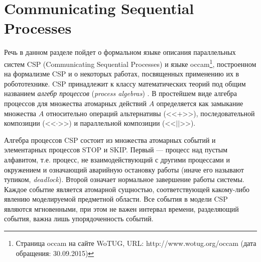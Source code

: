 \documentclass[conference]{IEEEtran}
\begin{document}
\section{Communicating Sequential Processes}
Речь в данном разделе пойдет о формальном языке описания параллельных систем CSP 
(Communicating Sequential Processes) и языке 
occam\footnote{Страница occam на сайте WoTUG, URL: http://www.wotug.org/occam (дата обращения: 30.09.2015)}, 
построенном на формализме CSP и о некоторых работах, посвященных применению их 
в робототехнике. CSP принадлежит к классу математических теорий под общим 
названием \textit{алгебр процессов} (\textit{process algebras})
\cite{baeten2005brief, fokkink2013introduction}. В простейшем виде алгебра 
процессов для множества атомарных действий $A$ определяется как замыкание 
множества $A$ относительно операций альтернативы (<<$+$>>), последовательной 
композиции (<<$\cdot$>>) и параллельной композиции (<<$||$>>).

Алгебра процессов CSP состоит из множества атомарных событий и элементарных 
процессов STOP и SKIP. Первый --- процесс над пустым алфавитом, т.е. процесс, 
не взаимодействующий с другими процессами и окружением и означающий аварийную 
остановку работы (иначе его называют тупиком, \textit{deadlock}). Второй означает 
нормальное завершение работы системы. Каждое событие является атомарной сущностью, 
соответствующей какому-либо явлению моделируемой предметной области. Все события 
в модели CSP являются мгновенными, при этом не важен интервал времени, 
разделяющий события, важна лишь упорядоченность событий.
\end{document}
